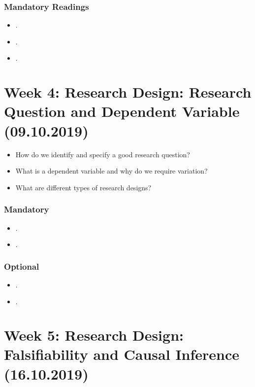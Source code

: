 \documentclass[abstract=on,parskip=full,headings=standardclasses,fontsize=11pt,paper=a4]{scrartcl}
\begin{document}
\subsubsection*{Mandatory Readings}
\begin{itemize}
\item {}.
\item {}.
\item {}.
\end{itemize}




\section{Week 4:  Research Design: Research Question and Dependent Variable  (09.10.2019)}

\begin{itemize}
\renewcommand\labelitemi{--}
\item How do we identify and specify a good research question?
\item What is a dependent variable and why do we require variation?
\item What are different types of research designs?
\end{itemize}


\subsubsection*{Mandatory}


\begin{itemize}
\item {}.
\item {}.
\end{itemize}


\subsubsection*{Optional}
\begin{itemize}
\item {}.
\item {}.
\end{itemize}

\section{Week 5: Research Design: Falsifiability and Causal Inference (16.10.2019)}
\end{document}
